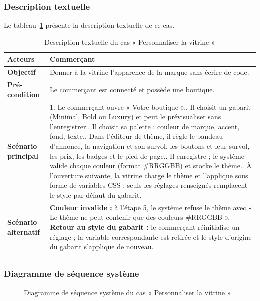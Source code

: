 \subsubsection{Description textuelle}
Le tableau~\ref{tab:uc-theme} présente la description textuelle de ce cas.
\renewcommand{\arraystretch}{1.5}
\begin{longtable}{|p{4cm}|p{11cm}|}
\hline
\textbf{Acteurs} & Commerçant \\
\hline
\textbf{Objectif} & Donner à la vitrine l'apparence de la marque sans écrire de code. \\
\hline
\textbf{Pré-condition} & Le commerçant est connecté et possède une boutique. \\
\hline
\textbf{Scénario principal} &
1. Le commerçant ouvre « Votre boutique ».\newline
2. Il choisit un gabarit (Minimal, Bold ou Luxury) et peut le prévisualiser sans l'enregistrer.\newline
3. Il choisit sa palette : couleur de marque, accent, fond, texte.\newline
4. Dans l'éditeur de thème, il règle le bandeau d'annonce, la navigation et son survol, les boutons et leur survol, les prix, les badges et le pied de page.\newline
5. Il enregistre ; le système valide chaque couleur (format \#RRGGBB) et stocke le thème.\newline
6. À l'ouverture suivante, la vitrine charge le thème et l'applique sous forme de variables CSS ; seuls les réglages renseignés remplacent le style par défaut du gabarit. \\
\hline
\textbf{Scénario alternatif} &
\textbf{Couleur invalide :} à l'étape 5, le système refuse le thème avec « Le thème ne peut contenir que des couleurs \#RRGGBB ».\newline
\textbf{Retour au style du gabarit :} le commerçant réinitialise un réglage ; la variable correspondante est retirée et le style d'origine du gabarit s'applique de nouveau. \\
\hline
\caption{Description textuelle du cas « Personnaliser la vitrine »}
\label{tab:uc-theme}
\end{longtable}

\subsubsection{Diagramme de séquence système}
\begin{figure}[H]
    \centering
    \caption{Diagramme de séquence système du cas « Personnaliser la vitrine »}
    \label{fig:dss-theme}
\end{figure}


